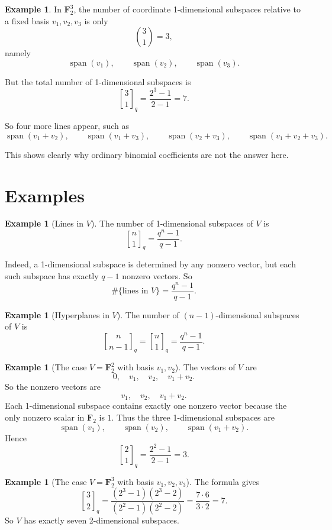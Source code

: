 \documentclass[11pt]{article}
\theoremstyle{definition}
\newtheorem{example}[theorem]{Example}
\theoremstyle{remark}
\newcommand{\F}{\mathbf{F}}
\newcommand{\Span}{\operatorname{span}}
\newcommand{\qbinom}[2]{\genfrac{[}{]}{0pt}{}{#1}{#2}_q}
\begin{document}
	\begin{example}
		In \(\F_2^3\), the number of coordinate 1-dimensional subspaces relative to a fixed basis \(v_1,v_2,v_3\) is only
		\[
		\binom{3}{1}=3,
		\]
		namely
		\[
		\Span(v_1),\qquad \Span(v_2),\qquad \Span(v_3).
		\]
		
		But the total number of 1-dimensional subspaces is
		\[
		\qbinom{3}{1}
		=
		\frac{2^3-1}{2-1}
		=
		7.
		\]
		
		So four more lines appear, such as
		\[
		\Span(v_1+v_2),\qquad
		\Span(v_1+v_3),\qquad
		\Span(v_2+v_3),\qquad
		\Span(v_1+v_2+v_3).
		\]
	\end{example}
	
	This shows clearly why ordinary binomial coefficients are not the answer here.
	
	\section{Examples}
	
	\begin{example}[Lines in \(V\)]
		The number of 1-dimensional subspaces of \(V\) is
		\[
		\qbinom{n}{1}
		=
		\frac{q^n-1}{q-1}.
		\]
		
		Indeed, a 1-dimensional subspace is determined by any nonzero vector, but each such subspace has exactly \(q-1\) nonzero vectors. So
		\[
		\#\{\text{lines in }V\}
		=
		\frac{q^n-1}{q-1}.
		\]
	\end{example}
	
	\begin{example}[Hyperplanes in \(V\)]
		The number of \((n-1)\)-dimensional subspaces of \(V\) is
		\[
		\qbinom{n}{n-1}
		=
		\qbinom{n}{1}
		=
		\frac{q^n-1}{q-1}.
		\]
	\end{example}
	
	\begin{example}[The case \(V=\F_2^2\) with basis \(v_1,v_2\)]
		The vectors of \(V\) are
		\[
		0,\quad v_1,\quad v_2,\quad v_1+v_2.
		\]
		So the nonzero vectors are
		\[
		v_1,\quad v_2,\quad v_1+v_2.
		\]
		Each 1-dimensional subspace contains exactly one nonzero vector because the only nonzero scalar in \(\F_2\) is \(1\). Thus the three 1-dimensional subspaces are
		\[
		\Span(v_1),\qquad
		\Span(v_2),\qquad
		\Span(v_1+v_2).
		\]
		Hence
		\[
		\qbinom{2}{1}
		=
		\frac{2^2-1}{2-1}
		=
		3.
		\]
	\end{example}
	
	\begin{example}[The case \(V=\F_2^3\) with basis \(v_1,v_2,v_3\)]
		The formula gives
		\[
		\qbinom{3}{2}
		=
		\frac{(2^3-1)(2^3-2)}{(2^2-1)(2^2-2)}
		=
		\frac{7\cdot 6}{3\cdot 2}
		=
		7.
		\]
		So \(V\) has exactly seven 2-dimensional subspaces.
	\end{example}
	
\end{document}
